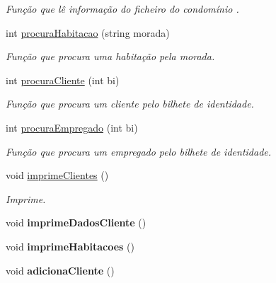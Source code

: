 \begin{DoxyCompactItemize}
\begin{DoxyCompactList}\small\item\em Função que lê informação do ficheiro do condomínio . \end{DoxyCompactList}\item 
int \hyperlink{class_interface_ac6040bbfe9d93dbe66073486895b350f}{procura\+Habitacao} (string morada)
\begin{DoxyCompactList}\small\item\em Função que procura uma habitação pela morada. \end{DoxyCompactList}\item 
int \hyperlink{class_interface_af478030a7565af1f96580afaafdd0cde}{procura\+Cliente} (int bi)
\begin{DoxyCompactList}\small\item\em Função que procura um cliente pelo bilhete de identidade. \end{DoxyCompactList}\item 
int \hyperlink{class_interface_a3f5893a482f5a1b2161dfcea02b79746}{procura\+Empregado} (int bi)
\begin{DoxyCompactList}\small\item\em Função que procura um empregado pelo bilhete de identidade. \end{DoxyCompactList}\item 
void \hyperlink{class_interface_adc4b93f87de9383d2d450435f38de4b3}{imprime\+Clientes} ()\hypertarget{class_interface_adc4b93f87de9383d2d450435f38de4b3}{}\label{class_interface_adc4b93f87de9383d2d450435f38de4b3}

\begin{DoxyCompactList}\small\item\em Imprime. \end{DoxyCompactList}\item 
void {\bfseries imprime\+Dados\+Cliente} ()\hypertarget{class_interface_ad534a51f3ad3d4127764dfeb8ec6889c}{}\label{class_interface_ad534a51f3ad3d4127764dfeb8ec6889c}

\item 
void {\bfseries imprime\+Habitacoes} ()\hypertarget{class_interface_a45714f2fad37ed40fa88432d3c2cf26f}{}\label{class_interface_a45714f2fad37ed40fa88432d3c2cf26f}

\item 
void {\bfseries adiciona\+Cliente} ()\hypertarget{class_interface_af3b831e11a69de725ed8454e03b41b18}{}\label{class_interface_af3b831e11a69de725ed8454e03b41b18}


\end{DoxyCompactItemize}
